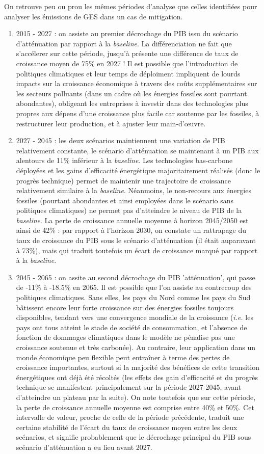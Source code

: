 \documentclass[a4,11pt]{aleph-notas}
\begin{document}
On retrouve peu ou prou les mêmes périodes d'analyse que celles identifiées pour analyser les émissions de GES dans un cas de mitigation.
\begin{enumerate}
    \item 2015 - 2027 : on assiste au premier décrochage du PIB issu du scénario d'atténuation par rapport à la \textit{baseline}. La différenciation ne fait que s'accélerer sur cette période, jusqu'à présente une différence de taux de croissance moyen de 75\% en 2027 ! Il est possible que l'introduction de politiques climatiques et leur temps de déploiment impliquent de lourds impacts sur la croissance économique à travers des coûts supplémentaires sur les secteurs polluants (dans un cadre où les énergies fossiles sont pourtant abondantes), obligeant les entreprises à investir dans des technologies plus propres aux dépens d'une croissance plus facile car soutenue par les fossiles, à restructurer leur production, et à ajuster leur main-d'œuvre. 
    \item 2027 - 2045 : les deux scénarios maintiennent une variation de PIB relativement constante, le scénario d'atténuation se maintenant à un PIB aux alentours de 11\% inférieur à la \textit{baseline}. Les technologies bas-carbone déployées et les gains d'efficacité énergétique majoritairement réalisés (donc le progrès technique) permet de maintenir une trajectoire de croissance relativement similaire à la \textit{baseline}. Néanmoins, le non-recours aux énergies fossiles (pourtant abondantes et ainsi employées dans le scénario sans politiques climatiques) ne permet pas d'atteindre le niveau de PIB de la \textit{baseline}. La perte de croissance annuelle moyenne à horizon 2045/2050 est ainsi de 42\% : par rapport à l'horizon 2030, on constate un rattrapage du taux de croissance du PIB sous le scénario d'atténuation (il était auparavant à 73\%), mais qui traduit toutefois un écart de croissance marqué par rapport à la \textit{baseline}.
    \item 2045 - 2065 : on assite au second décrochage du PIB 'atténuation', qui passe de -11\% à -18.5\% en 2065. Il est possible que l'on assiste au contrecoup des politiques climatiques. Sans elles, les pays du Nord comme les pays du Sud bâtissent encore leur forte croissance sur des énergies fossiles toujours disponibles, tendant vers une convergence mondiale de la croissance (\textit{i.e.} les pays ont tous atteint le stade de société de consommation, et l'absence de fonction de dommages climatiques dans le modèle ne pénalise pas une croissance soutenue et très carbonée). Au contraire, leur application dans un monde économique peu flexible peut entraîner à terme des pertes de croissance importantes, surtout si la majorité des bénéfices de cette transition énergétiques ont déjà été récoltés (les effets des gain d'efficacité et du progrès technique se manifestent principalement sur la période 2027-2045, avant d'atteindre un plateau par la suite). On note toutefois que sur cette période, la perte de croissance annuelle moyenne est comprise entre 40\% et 50\%. Cet intervalle de valeur, proche de celle de la période précédente, traduit une certaine stabilité de l'écart du taux de croissance moyen entre les deux scénarios, et signifie probablement que le décrochage principal du PIB sous scénario d'atténuation a eu lieu avant 2027.

\end{enumerate}
\end{document}
